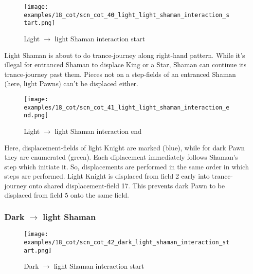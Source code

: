 \vspace*{-1.2\baselineskip}
\noindent
\begin{figure}[!h]
\texttt{[image: examples/18\_cot/scn\_cot\_40\_light\_light\_shaman\_interaction\_start.png]}
\caption{Light $\rightarrow$ light Shaman interaction start}
\label{fig:scn_cot_40_light_light_shaman_interaction_start}
\end{figure}

Light Shaman is about to do trance-journey along right-hand pattern. While it's
illegal for entranced Shaman to displace King or a Star, Shaman can continue its
trance-journey past them. Pieces not on a step-fields of an entranced Shaman (here,
light Pawns) can't be displaced either.

\clearpage %

\noindent
\begin{figure}[!h]
\texttt{[image: examples/18\_cot/scn\_cot\_41\_light\_light\_shaman\_interaction\_end.png]}
\caption{Light $\rightarrow$ light Shaman interaction end}
\label{fig:scn_cot_41_light_light_shaman_interaction_end}
\end{figure}

Here, displacement-fields of light Knight are marked (blue), while for dark Pawn
they are enumerated (green). Each diplacement immediately follows Shaman's step
which initiate it. So, displacements are performed in the same order in which steps
are performed. Light Knight is displaced from field 2 early into trance-journey
onto shared displacement-field 17. This prevents dark Pawn to be displaced from
field 5 onto the same field.

\clearpage %

\subsubsection*{Dark $\rightarrow$ light Shaman}
\label{sec:Conquest of Tlalocan/Trance-journey/Interactions/Dark --> light Shaman}

\vspace*{-1.4\baselineskip}
\noindent
\begin{figure}[!h]
\texttt{[image: examples/18\_cot/scn\_cot\_42\_dark\_light\_shaman\_interaction\_start.png]}
\caption{Dark $\rightarrow$ light Shaman interaction start}
\label{fig:scn_cot_42_dark_light_shaman_interaction_start}
\end{figure}

